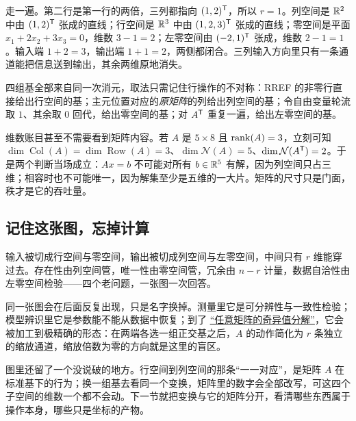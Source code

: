 走一遍。第二行是第一行的两倍，三列都指向 \((1,2)^{\mathsf{T}}\)，所以 \(r=1\)。列空间是 \(\mathbb{R}^2\) 中由 \((1,2)^{\mathsf{T}}\) 张成的直线；行空间是 \(\mathbb{R}^3\) 中由 \((1,2,3)^{\mathsf{T}}\) 张成的直线；零空间是平面 \(x_1+2x_2+3x_3=0\)，维数 \(3-1=2\)；左零空间由 \((-2,1)^{\mathsf{T}}\) 张成，维数 \(2-1=1\)。输入端 \(1+2=3\)，输出端 \(1+1=2\)，两侧都闭合。三列输入方向里只有一条通道能把信息送到输出，其余两维原地消失。

四组基全部来自同一次消元，取法只需记住行操作的不对称：RREF 的非零行直接给出行空间的基；主元位置对应的\emph{原矩阵}的列给出列空间的基；令自由变量轮流取 \(1\)、其余取 \(0\) 回代，给出零空间的基；对 \(A^{\mathsf{T}}\) 重复一遍，给出左零空间的基。

维数账目甚至不需要看到矩阵内容。若 \(A\) 是 \(5\times 8\) 且 \(\operatorname{rank}(A)=3\)，立刻可知 \(\dim\operatorname{Col}(A)=\dim\operatorname{Row}(A)=3\)、\(\dim\mathcal N(A)=5\)、\(\dim\mathcal N(A^{\mathsf{T}})=2\)。于是两个判断当场成立：\(Ax=b\) 不可能对所有 \(b\in\mathbb{R}^5\) 有解，因为列空间只占三维；相容时也不可能唯一，因为解集至少是五维的一大片。矩阵的尺寸只是门面，秩才是它的吞吐量。

\subsection{记住这张图，忘掉计算}

输入被切成行空间与零空间，输出被切成列空间与左零空间，中间只有 \(r\) 维能穿过去。存在性由列空间管，唯一性由零空间管，冗余由 \(n-r\) 计量，数据自洽性由左零空间检验——四个老问题，一张图一次回答。

同一张图会在后面反复出现，只是名字换掉。测量里它是可分辨性与一致性检验；模型辨识里它是参数能不能从数据中恢复；到了 \hyperref[sec:03-Linear-Algebra/07-SVD-and-Data-Applications/01]{``任意矩阵的奇异值分解''}，它会被加工到极精确的形态：在两端各选一组正交基之后，\(A\) 的动作简化为 \(r\) 条独立的缩放通道，缩放倍数为零的方向就是这里的盲区。

图里还留了一个没说破的地方。行空间到列空间的那条``一一对应''，是矩阵 \(A\) 在标准基下的行为；换一组基去看同一个变换，矩阵里的数字会全部改写，可这四个子空间的维数一个都不会动。下一节就把变换与它的矩阵分开，看清哪些东西属于操作本身，哪些只是坐标的产物。
